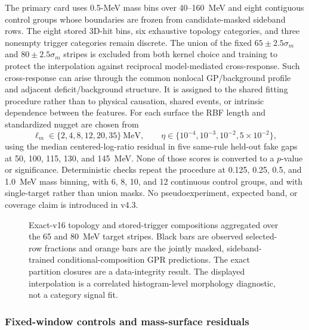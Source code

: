 The primary card uses 0.5-MeV mass bins over 40--160~MeV and eight contiguous
control groups whose boundaries are frozen from candidate-masked sideband
rows.  The eight stored 3D-hit bins, six exhaustive topology categories, and
three nonempty trigger categories remain discrete.  The union of the fixed
$65\pm2.5\sigma_m$ and $80\pm2.5\sigma_m$ stripes is excluded from both
kernel choice and training to protect the interpolation against reciprocal
model-mediated cross-response.  Such cross-response can arise through the
common nonlocal GP/background profile and adjacent deficit/background
structure.  It is assigned to the shared fitting procedure rather than to
physical causation, shared events, or intrinsic dependence between the
features.  For each surface the RBF length
and
standardized nugget are chosen from
\begin{equation}
 \ell_m\in\{2,4,8,12,20,35\}\ \mathrm{MeV},\qquad
 \eta\in\{10^{-4},10^{-3},10^{-2},5\times10^{-2}\},
\end{equation}
using the median centered-log-ratio residual in five same-rule held-out fake
gaps at 50, 100, 115, 130, and 145~MeV.  None of those scores is converted to
a $p$-value or significance.  Deterministic checks repeat the procedure at
0.125, 0.25, 0.5, and 1.0~MeV mass binning, with 6, 8, 10, and 12 continuous
control groups, and with single-target rather than union masks.  No
pseudoexperiment, expected band, or coverage claim is introduced in v4.3.

\begin{figure}[H]
\centering
{}
\caption{Exact-v16 topology and stored-trigger compositions aggregated over
the 65 and 80~MeV target stripes.  Black bars are observed selected-row
fractions and orange bars are the jointly masked, sideband-trained
conditional-composition GPR predictions.  The exact partition closures are a
data-integrity result.  The displayed interpolation is a correlated
histogram-level morphology diagnostic, not a category signal fit.}
\label{fig:v4p3-partition-composition}
\end{figure}

\subsubsection{Fixed-window controls and mass-surface residuals}
\label{app:v4p3-control-results}

